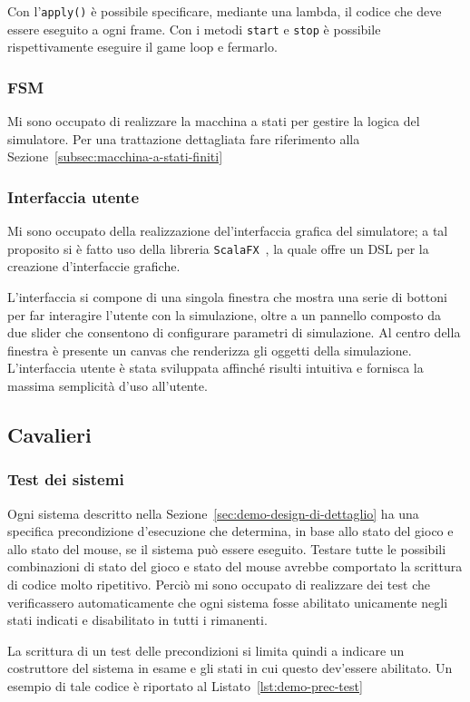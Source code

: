 Con l'\texttt{apply()} è possibile specificare, mediante una lambda, il codice che deve essere eseguito a ogni
frame.
Con i metodi \texttt{start} e \texttt{stop} è possibile rispettivamente eseguire il game loop e fermarlo.

\subsubsection{FSM}
Mi sono occupato di realizzare la macchina a stati per gestire la logica del simulatore.
Per una trattazione dettagliata fare riferimento alla Sezione~\ref{subsec:macchina-a-stati-finiti}

\subsubsection{Interfaccia utente}
Mi sono occupato della realizzazione del'interfaccia grafica del simulatore;
a tal proposito si è fatto uso della libreria \texttt{ScalaFX}~\cite{scalafx}, la quale offre un DSL per la creazione
d'interfaccie grafiche.

L'interfaccia si compone di una singola finestra che mostra una serie di bottoni per far interagire l'utente con la
simulazione, oltre a un pannello composto da due slider che consentono di configurare parametri di simulazione.
Al centro della finestra è presente un canvas che renderizza gli oggetti della simulazione.
L'interfaccia utente è stata sviluppata affinché risulti intuitiva e fornisca la massima semplicità d'uso all'utente.

\subsection{Cavalieri}\label{subsec:demo-cavalieri}
\subsubsection{Test dei sistemi}
Ogni sistema descritto nella Sezione~\ref{sec:demo-design-di-dettaglio} ha una specifica precondizione d'esecuzione
che determina, in base allo stato del gioco e allo stato del mouse, se il sistema può essere eseguito.
Testare tutte le possibili combinazioni di stato del gioco e stato del mouse avrebbe comportato la scrittura di codice
molto ripetitivo.
Perciò mi sono occupato di realizzare dei test che verificassero automaticamente che ogni sistema
fosse abilitato unicamente negli stati indicati e disabilitato in tutti i rimanenti.

La scrittura di un test delle precondizioni si limita quindi a indicare un costruttore del sistema in esame e
gli stati in cui questo dev'essere abilitato.
Un esempio di tale codice è riportato al Listato~\ref{lst:demo-prec-test}

